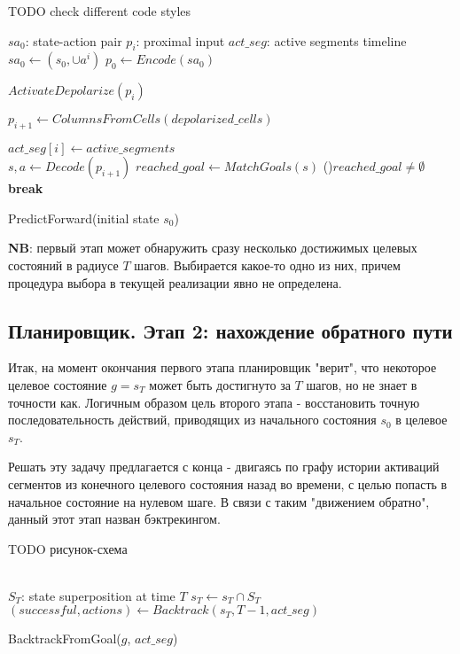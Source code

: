 \documentclass[a4paper]{article}
\begin{document}
TODO check different code styles
\begin{function}
  $sa_0$: state-action pair \;
  $p_i$: proximal input \;
  $act\_seg$: active segments timeline \;
  \quad \\

  $sa_0 \leftarrow (s_0, \cup a^i)$ \;
  $p_0 \leftarrow Encode(sa_0)$ \;

   {
    $ActivateDepolarize(p_i)$ 
    
    $p_{i+1} \leftarrow ColumnsFromCells(depolarized\_cells)$ 
    
    $act\_seg[i] \leftarrow active\_segments$ 
    \quad \\
    
    $s, a \leftarrow Decode(p_{i+1})$ \;
    $reached\_goal \leftarrow MatchGoals(s)$ \;
    \If(){$reached\_goal \neq \emptyset$} {
      \textbf{break}
    }{}
  }
  
   \;

  \caption{PredictForward(initial state $s_0$)}
\end{function}

\textbf{NB}: первый этап может обнаружить сразу несколько достижимых целевых состояний в радиусе $T$ шагов. Выбирается какое-то одно из них, причем процедура выбора в текущей реализации явно не определена.

\subsection{Планировщик. Этап 2: нахождение обратного пути}

Итак, на момент окончания первого этапа планировщик "верит", что некоторое целевое состояние $g = s_T$ может быть достигнуто за $T$ шагов, но не знает в точности как. Логичным образом цель второго этапа - восстановить 
точную последовательность действий, приводящих из начального состояния $s_0$ в целевое $s_T$.

Решать эту задачу предлагается с конца - двигаясь по графу истории активаций сегментов из конечного целевого состояния назад во времени, с целью попасть в начальное состояние на нулевом шаге. В связи с таким "движением обратно", данный этот этап назван бэктрекингом.

TODO рисунок-схема

\begin{function}
  \SetAlgoNoLine
  \quad \\

  $S_T$: state superposition at time $T$ \;
  $s_T \leftarrow s_T \cap S_T$ \;
  $(successful, actions) \leftarrow Backtrack(s_T, T-1, act\_seg)$ \;
  \caption{BacktrackFromGoal($g$, $act\_seg$)}
\end{function}
\end{document}
